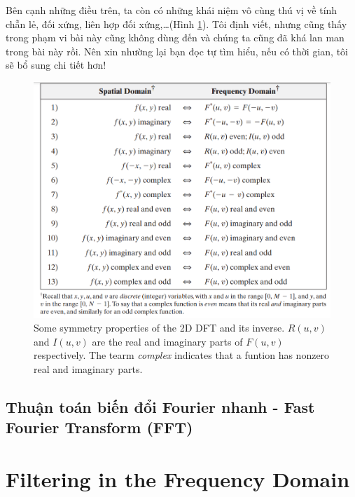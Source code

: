 \documentclass{article}
\begin{document}
        Bên cạnh những điều trên, ta còn có những khái niệm vô cùng thú vị về tính chẵn lẻ, đối xứng, liên hợp đối xứng,\ldots (Hình \ref{fig6}). Tôi định viết, nhưng cũng thấy trong phạm vi bài này cũng không dùng đến và chúng ta cũng đã khá lan man trong bài này rồi. Nên xin nhường lại bạn đọc tự tìm hiểu, nếu có thời gian, tôi sẽ bổ sung chi tiết hơn!
        \begin{figure}
        \centering
        \includegraphics[width = \linewidth]{fo4.png}
        \caption{Some symmetry properties of the 2D DFT and its inverse. $R(u,v)$ and $I(u,v)$ are the real and imaginary parts of $F(u,v)$ respectively. The tearm \textit{complex} indicates that a funtion has nonzero real and imaginary parts.}
        \label{fig6}
        \end{figure}
        
        \subsection{Thuận toán biến đổi Fourier nhanh - Fast Fourier Transform (FFT)}
        \section{Filtering in the Frequency Domain}
\end{document}
